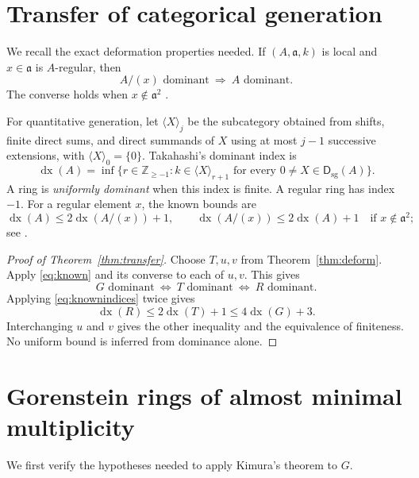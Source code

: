 \documentclass[11pt]{article}
\theoremstyle{remark}\newtheorem{remark}[theorem]{Remark}
\newcommand{\dx}{\operatorname{dx}}
\newcommand{\Dsg}{\mathsf D_{\mathrm{sg}}}
\begin{document}
\section{Transfer of categorical generation}
We recall the exact deformation properties needed. If $(A,\mathfrak a,k)$ is local and $x\in\mathfrak a$ is $A$-regular, then
\begin{equation}\label{eq:known}
 A/(x)\text{ dominant}\ \Longrightarrow\ A\text{ dominant}.
\end{equation}
The converse holds when $x\notin\mathfrak a^2$ \cite[Theorem 5.6]{T}.

For quantitative generation, let $\langle X\rangle_j$ be the subcategory obtained from shifts, finite direct sums, and direct summands of $X$ using at most $j-1$ successive extensions, with $\langle X\rangle_0=\{0\}$. Takahashi's dominant index is
\[
 \dx(A)=\inf\{r\in\mathbb Z_{\ge-1}:k\in\langle X\rangle_{r+1}
       \text{ for every }0\ne X\in\Dsg(A)\}.
\]
A ring is \emph{uniformly dominant} when this index is finite. A regular ring has index $-1$. For a regular element $x$, the known bounds are
\begin{equation}\label{eq:knownindices}
 \dx(A)\le2\dx(A/(x))+1,
 \qquad
 \dx(A/(x))\le2\dx(A)+1\quad\text{if }x\notin\mathfrak a^2;
\end{equation}
see \cite[Theorem 6.2]{U}.

\begin{proof}[Proof of Theorem~\ref{thm:transfer}]
Choose $T,u,v$ from Theorem~\ref{thm:deform}. Apply \eqref{eq:known} and its converse to each of $u,v$. This gives
\[
 G\text{ dominant}\ \Longleftrightarrow\ T\text{ dominant}
 \ \Longleftrightarrow\ R\text{ dominant}.
\]
Applying \eqref{eq:knownindices} twice gives
\[
 \dx(R)\le2\dx(T)+1\le4\dx(G)+3.
\]
Interchanging $u$ and $v$ gives the other inequality and the equivalence of finiteness. No uniform bound is inferred from dominance alone.
\end{proof}

\section{Gorenstein rings of almost minimal multiplicity}
We first verify the hypotheses needed to apply Kimura's theorem to $G$.
\end{document}

